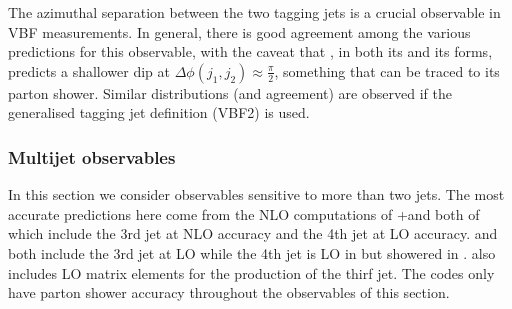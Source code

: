 The azimuthal separation between the two tagging jets is a crucial
observable in VBF measurements. In general, there is good agreement 
among the various predictions for this observable, with the caveat
that \hjetscompSherpa, in both its \hjetscompNNLOPS and its \hjetscompMEPSatNLO forms, predicts a
shallower dip at $\Delta\phi(j_1,j_2)\approx\tfrac{\pi}{2}$, something
that can be traced to its parton shower. Similar distributions (and
agreement) are observed if the generalised tagging jet definition
(VBF2) is used.




\subsubsection{Multijet observables}
\label{sec:hjetscomp:results:mjobs}

In this section we consider observables sensitive to more than two jets.
The most accurate predictions here come from the NLO computations of 
\hjetscompGoSam{}+\hjetscompSherpa and \hjetscompSherpa \hjetscompMEPSatNLO both of which include the 3rd 
jet at NLO accuracy and the 4th jet at LO accuracy. \hjetscompMGaMC and \hjetscompHerwig 
both include the 3rd jet at LO while the 4th jet is LO in \hjetscompHerwig but 
showered in \hjetscompMGaMC. \hjetscompHej also includes LO matrix elements for the production 
of the thirf jet. The \hjetscompNNLOPS codes only have parton shower accuracy 
throughout the observables of this section.


